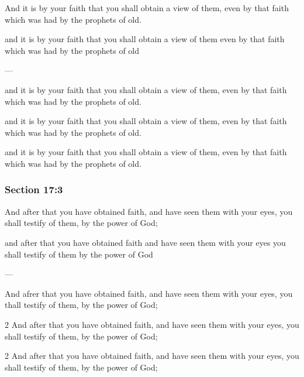		And it is by your faith that you shall obtain a view of them, even by that faith which was had by the prophets of old.

		\begin{framed}
		\scriptsize
			\begin{compactdesc}
				\item[JSP] and it is by your faith that you shall obtain a view of them even by that faith which was had by the prophets of old 
				\item[BC] --- 
				\item[MA] and it is by your faith that you shall obtain a view of them, even by that faith which was had by the prophets of old.
				\item[DC 1835] and it is by your faith that you shall obtain a view of them, even by that faith which was had by the prophets of old.
				\item[DC 1844] and it is by your faith that you shall obtain a view of them, even by that faith which was had by the prophets of old.
			\end{compactdesc}
		\end{framed}

	\subsubsection{Section 17:3} %
		\label{DC17-3}

		And after that you have obtained faith, and have seen them with your eyes, you shall testify of them, by the power of God;

		\begin{framed}
		\scriptsize
			\begin{compactdesc}
				\item[JSP] and after that you have obtained faith and have seen them with your eyes you shall testify of them by the power of God 
				\item[BC] --- 
				\item[MA] And afrer that you have obtained faith, and have seen them with your eyes, you thall testify of them, by the power of God; 
				\item[DC 1835] 2 And after that you have obtained faith, and have seen them with your eyes, you shall testify of them, by the power of God; 
				\item[DC 1844] 2 And after that you have obtained faith, and have seen them with your eyes, you shall testify of them, by the power of God; 
			\end{compactdesc}
		\end{framed}

